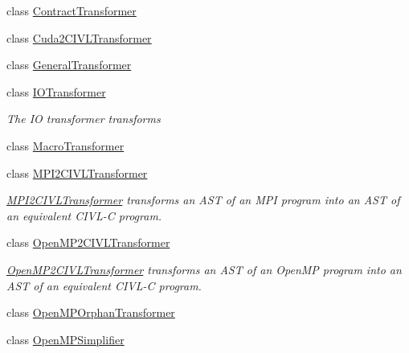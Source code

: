 \begin{DoxyCompactItemize}
\item 
class \hyperlink{classedu_1_1udel_1_1cis_1_1vsl_1_1civl_1_1transform_1_1IF_1_1ContractTransformer}{Contract\+Transformer}
\item 
class \hyperlink{classedu_1_1udel_1_1cis_1_1vsl_1_1civl_1_1transform_1_1IF_1_1Cuda2CIVLTransformer}{Cuda2\+C\+I\+V\+L\+Transformer}
\item 
class \hyperlink{classedu_1_1udel_1_1cis_1_1vsl_1_1civl_1_1transform_1_1IF_1_1GeneralTransformer}{General\+Transformer}
\item 
class \hyperlink{classedu_1_1udel_1_1cis_1_1vsl_1_1civl_1_1transform_1_1IF_1_1IOTransformer}{I\+O\+Transformer}
\begin{DoxyCompactList}\small\item\em The I\+O transformer transforms~\newline
 \end{DoxyCompactList}\item 
class \hyperlink{classedu_1_1udel_1_1cis_1_1vsl_1_1civl_1_1transform_1_1IF_1_1MacroTransformer}{Macro\+Transformer}
\item 
class \hyperlink{classedu_1_1udel_1_1cis_1_1vsl_1_1civl_1_1transform_1_1IF_1_1MPI2CIVLTransformer}{M\+P\+I2\+C\+I\+V\+L\+Transformer}
\begin{DoxyCompactList}\small\item\em \hyperlink{classedu_1_1udel_1_1cis_1_1vsl_1_1civl_1_1transform_1_1IF_1_1MPI2CIVLTransformer}{M\+P\+I2\+C\+I\+V\+L\+Transformer} transforms an A\+S\+T of an M\+P\+I program into an A\+S\+T of an equivalent C\+I\+V\+L-\/\+C program. \end{DoxyCompactList}\item 
class \hyperlink{classedu_1_1udel_1_1cis_1_1vsl_1_1civl_1_1transform_1_1IF_1_1OpenMP2CIVLTransformer}{Open\+M\+P2\+C\+I\+V\+L\+Transformer}
\begin{DoxyCompactList}\small\item\em \hyperlink{classedu_1_1udel_1_1cis_1_1vsl_1_1civl_1_1transform_1_1IF_1_1OpenMP2CIVLTransformer}{Open\+M\+P2\+C\+I\+V\+L\+Transformer} transforms an A\+S\+T of an Open\+M\+P program into an A\+S\+T of an equivalent C\+I\+V\+L-\/\+C program. \end{DoxyCompactList}\item 
class \hyperlink{classedu_1_1udel_1_1cis_1_1vsl_1_1civl_1_1transform_1_1IF_1_1OpenMPOrphanTransformer}{Open\+M\+P\+Orphan\+Transformer}
\item 
class \hyperlink{classedu_1_1udel_1_1cis_1_1vsl_1_1civl_1_1transform_1_1IF_1_1OpenMPSimplifier}{Open\+M\+P\+Simplifier}

\end{DoxyCompactItemize}
